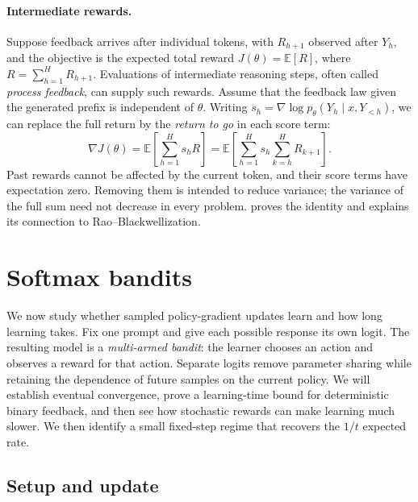 \documentclass[11pt,twoside]{article}
\newcommand{\E}{\mathbb E}
\theoremstyle{definition}
\theoremstyle{remark}
\begin{document}
\paragraph{Intermediate rewards.}
Suppose feedback arrives after individual tokens, with $R_{h+1}$ observed
after $Y_h$, and the objective is the expected total reward
$J(\theta)=\E[R]$, where $R=\sum_{h=1}^H R_{h+1}$.
Evaluations of intermediate reasoning steps, often called \emph{process
feedback}, can supply such rewards. Assume that the feedback law given the
generated prefix is independent of $\theta$. Writing
$s_h=\nabla\log p_\theta(Y_h\mid x,Y_{<h})$, we can replace the full return
by the \emph{return to go} in each score term:
\[
 \nabla J(\theta)
 =\E\!\left[\sum_{h=1}^H s_h R\right]
 =\E\!\left[\sum_{h=1}^H s_h\sum_{k=h}^H R_{k+1}\right].
\]
Past rewards cannot be affected by the current token, and their score terms
have expectation zero. Removing them is intended to reduce variance;
the variance of the full sum need not decrease in every problem.
 proves the identity and explains its connection to
Rao--Blackwellization.

\section{Softmax bandits}
\label{sec:bandits}

We now study whether sampled policy-gradient updates learn and how long
learning takes. Fix one prompt and give each possible response its own
logit. The resulting model is a \emph{multi-armed bandit}: the learner
chooses an action and observes a reward for that action. Separate logits
remove parameter sharing while retaining the dependence of future samples
on the current policy. We will establish eventual convergence, prove a
learning-time bound for deterministic binary feedback, and then see how
stochastic rewards can make learning much slower. We then identify a small
fixed-step regime that recovers the $1/t$ expected rate.

\subsection{Setup and update}
\label{sec:bandit-setup}
\end{document}
